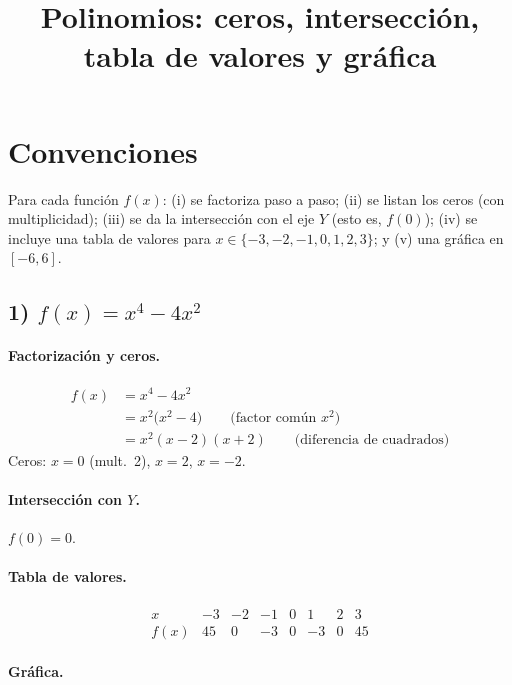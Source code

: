 \documentclass[12pt,a4paper]{article}
\title{Polinomios: ceros, intersección, tabla de valores y gráfica}
\author{}
\date{}
\begin{document}
	\maketitle
	
	\section*{Convenciones}
	Para cada función \(f(x)\): (i) se factoriza paso a paso; (ii) se listan los ceros (con multiplicidad);
	(iii) se da la intersección con el eje \(Y\) (esto es, \(f(0)\)); (iv) se incluye una tabla de valores
	para \(x\in\{-3,-2,-1,0,1,2,3\}\); y (v) una gráfica en \([-6,6]\).
	
	\bigskip
	
	\subsection*{1) \(f(x)=x^{4}-4x^{2}\)}
	\paragraph{Factorización y ceros.}
	\begin{align*}
		f(x) &= x^{4}-4x^{2}\\
		&= x^{2}\bigl(x^{2}-4\bigr) \qquad \text{(factor común }x^{2})\\
		&= x^{2}(x-2)(x+2) \qquad \text{(diferencia de cuadrados)}
	\end{align*}
	Ceros: \(x=0\) (mult.\ 2), \(x=2\), \(x=-2\).
	
	\paragraph{Intersección con \(Y\).} \(f(0)=0\).
	
	\paragraph{Tabla de valores.}
	\[
	\begin{array}{c|rrrrrrr}
		x & -3 & -2 & -1 & 0 & 1 & 2 & 3\\\hline
		f(x) & 45 & 0 & -3 & 0 & -3 & 0 & 45
	\end{array}
	\]
	
	\paragraph{Gráfica.}
	
\end{document}
